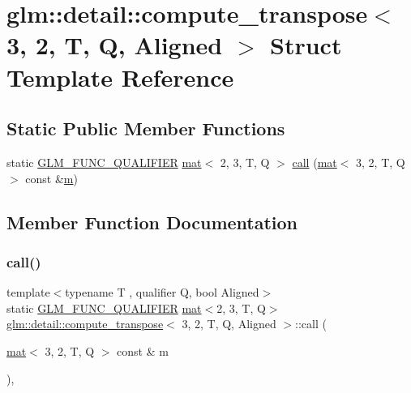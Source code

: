 \hypertarget{structglm_1_1detail_1_1compute__transpose_3_013_00_012_00_01_t_00_01_q_00_01_aligned_01_4}{}\section{glm\+:\+:detail\+:\+:compute\+\_\+transpose$<$ 3, 2, T, Q, Aligned $>$ Struct Template Reference}
\label{structglm_1_1detail_1_1compute__transpose_3_013_00_012_00_01_t_00_01_q_00_01_aligned_01_4}
\subsection*{Static Public Member Functions}
\begin{DoxyCompactItemize}
\item 
static \mbox{\hyperlink{setup_8hpp_a33fdea6f91c5f834105f7415e2a64407}{G\+L\+M\+\_\+\+F\+U\+N\+C\+\_\+\+Q\+U\+A\+L\+I\+F\+I\+ER}} \mbox{\hyperlink{structglm_1_1mat}{mat}}$<$ 2, 3, T, Q $>$ \mbox{\hyperlink{structglm_1_1detail_1_1compute__transpose_3_013_00_012_00_01_t_00_01_q_00_01_aligned_01_4_adcfdfa46dfc616422904330e7a05cbf3}{call}} (\mbox{\hyperlink{structglm_1_1mat}{mat}}$<$ 3, 2, T, Q $>$ const \&\mbox{\hyperlink{_s_d_l__opengl__glext_8h_af593500c283bf1a787a6f947f503a5c2}{m}})
\end{DoxyCompactItemize}


\subsection{Member Function Documentation}
\mbox{\label{structglm_1_1detail_1_1compute__transpose_3_013_00_012_00_01_t_00_01_q_00_01_aligned_01_4_adcfdfa46dfc616422904330e7a05cbf3}} 
\subsubsection{\texorpdfstring{call()}{call()}}
{\footnotesize\ttfamily template$<$typename T , qualifier Q, bool Aligned$>$ \\
static \mbox{\hyperlink{setup_8hpp_a33fdea6f91c5f834105f7415e2a64407}{G\+L\+M\+\_\+\+F\+U\+N\+C\+\_\+\+Q\+U\+A\+L\+I\+F\+I\+ER}} \mbox{\hyperlink{structglm_1_1mat}{mat}}$<$2, 3, T, Q$>$ \mbox{\hyperlink{structglm_1_1detail_1_1compute__transpose}{glm\+::detail\+::compute\+\_\+transpose}}$<$ 3, 2, T, Q, Aligned $>$\+::call (\begin{DoxyParamCaption}\item[{\mbox{\hyperlink{structglm_1_1mat}{mat}}$<$ 3, 2, T, Q $>$ const \&}]{m }\end{DoxyParamCaption})\hspace{0.3cm}{\ttfamily [inline]}, {\ttfamily [static]}}



